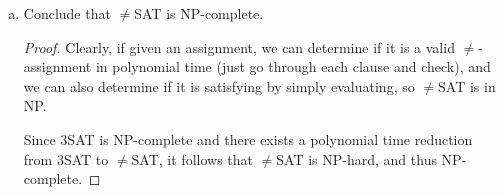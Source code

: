 \documentclass{article}
\begin{document}
\begin{enumerate}
\begin{enumerate}[(a)]
\begin{proof}
					$(\impliedby):$ Consider a satisfying $\neq$-assignment to clauses $i$ being $(y_1\vee y_2\vee z_i)$ and $(\bar z_i\vee y_3\vee b).$ If one of $y_1, y_2,$ or $y_3$ is not 0, then the clause $(y_1\vee y_2\vee y_3)$ would be satisfied. Otherwise, if they are all 0, then by part (a), negating this $\neq$-assignment will still be satisfying, which means one of $\bar y_1, \bar y_2,$ or $\bar y_3$ would not be 0, and thus $(\bar y_1\vee \bar y_2\vee\bar y_3)$ is a satisfying assignment for 3SAT. Clearly this is polynomial time, so if there exists a satisfying assignment to the $\neq$SAT, there exists a satisfying assignment for SAT.
				\end{proof}

			\item Conclude that $\neq$SAT is NP-complete.
				\begin{proof}
					Clearly, if given an assignment, we can determine if it is a valid $\neq$-assignment in polynomial time (just go through each clause and check), and we can also determine if it is satisfying by simply evaluating, so $\neq$SAT is in NP.

					Since 3SAT is NP-complete and there exists a polynomial time reduction from 3SAT to $\neq$SAT, it follows that $\neq$SAT is NP-hard, and thus NP-complete.
				\end{proof}

		\end{enumerate}

\end{enumerate}
\end{document}
